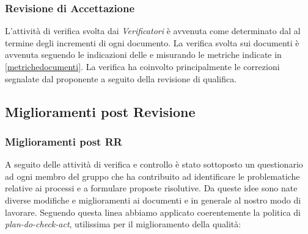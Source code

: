 		\subsubsection{Revisione di Accettazione}
		L'attività di verifica svolta dai \emph{Verificatori} è avvenuta come determinato dal \PianoDiProgetto{} al termine degli incrementi di ogni documento. La verifica svolta sui documenti è avvenuta seguendo le indicazioni delle \NormeDiProgetto{} e misurando le metriche indicate in \ref{metrichedocumenti}. La verifica ha coinvolto principalmente le correzioni segnalate dal proponente a seguito della revisione di qualifica.

	
	 \pagebreak
	 \subsection{Miglioramenti post Revisione}
	 
	 	\subsubsection{Miglioramenti post RR}
		A seguito delle attività di verifica e controllo è stato sottoposto un questionario ad ogni membro del gruppo che ha contribuito ad identificare le problematiche relative ai processi e a formulare proposte risolutive. Da queste idee sono nate diverse modifiche e miglioramenti ai documenti e in generale al nostro modo di lavorare. Seguendo questa linea abbiamo applicato coerentemente la politica di \textit{plan-do-check-act}, utilissima per il miglioramento della qualità: \\
			

